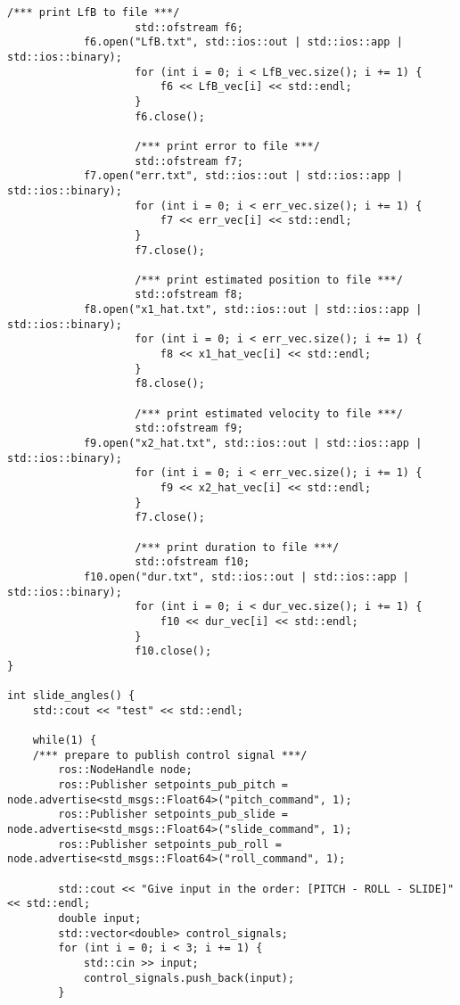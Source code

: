 \begin{lstlisting}[language=gedit]
                    /*** print LfB to file ***/
                    std::ofstream f6;
		    f6.open("LfB.txt", std::ios::out | std::ios::app | std::ios::binary);
                    for (int i = 0; i < LfB_vec.size(); i += 1) {
                        f6 << LfB_vec[i] << std::endl;
                    }
                    f6.close();

                    /*** print error to file ***/
                    std::ofstream f7;
		    f7.open("err.txt", std::ios::out | std::ios::app | std::ios::binary);
                    for (int i = 0; i < err_vec.size(); i += 1) {
                        f7 << err_vec[i] << std::endl;
                    }
                    f7.close();

                    /*** print estimated position to file ***/
                    std::ofstream f8;
		    f8.open("x1_hat.txt", std::ios::out | std::ios::app | std::ios::binary);
                    for (int i = 0; i < err_vec.size(); i += 1) {
                        f8 << x1_hat_vec[i] << std::endl;
                    }
                    f8.close();

                    /*** print estimated velocity to file ***/
                    std::ofstream f9;
		    f9.open("x2_hat.txt", std::ios::out | std::ios::app | std::ios::binary);
                    for (int i = 0; i < err_vec.size(); i += 1) {
                        f9 << x2_hat_vec[i] << std::endl;
                    }
                    f7.close();

                    /*** print duration to file ***/
                    std::ofstream f10;
		    f10.open("dur.txt", std::ios::out | std::ios::app | std::ios::binary);
                    for (int i = 0; i < dur_vec.size(); i += 1) {
                        f10 << dur_vec[i] << std::endl;
                    }
                    f10.close();
}

int slide_angles() {
    std::cout << "test" << std::endl;
 
    while(1) {
    /*** prepare to publish control signal ***/ 
        ros::NodeHandle node;
        ros::Publisher setpoints_pub_pitch = node.advertise<std_msgs::Float64>("pitch_command", 1);
        ros::Publisher setpoints_pub_slide = node.advertise<std_msgs::Float64>("slide_command", 1);
        ros::Publisher setpoints_pub_roll = node.advertise<std_msgs::Float64>("roll_command", 1);

        std::cout << "Give input in the order: [PITCH - ROLL - SLIDE]" << std::endl;
        double input;
        std::vector<double> control_signals;
        for (int i = 0; i < 3; i += 1) {
            std::cin >> input;
            control_signals.push_back(input);
        }
   

\end{lstlisting}
